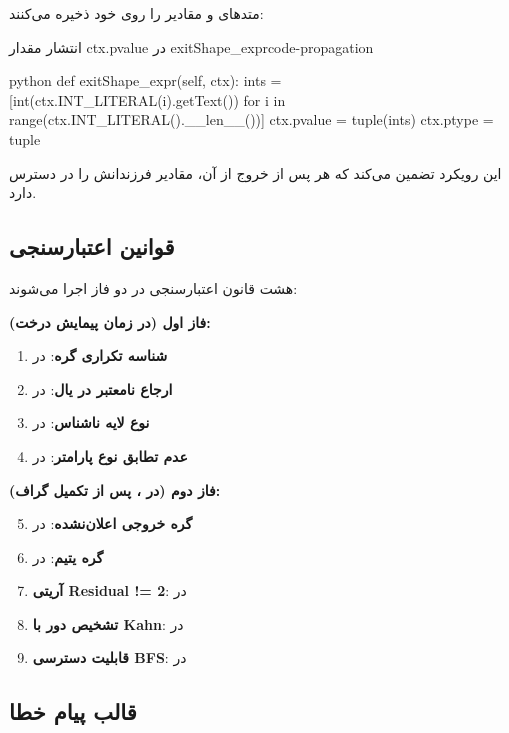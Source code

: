 \documentclass{nngraph-fa}
\begin{document}
متدهای  و  مقادیر را روی خود
 ذخیره می‌کنند:

\begin{codebox}{انتشار مقدار ctx.pvalue در exitShape\_expr}{code-propagation}
\begin{amzcode}{python}
def exitShape_expr(self, ctx):
    ints = [int(ctx.INT_LITERAL(i).getText())
            for i in range(ctx.INT_LITERAL().__len__())]
    ctx.pvalue = tuple(ints)
    ctx.ptype  = tuple
\end{amzcode}
\end{codebox}

این رویکرد تضمین می‌کند که هر  پس از خروج از آن، مقادیر
فرزندانش را در دسترس دارد.

\subsection{قوانین اعتبارسنجی}

هشت قانون اعتبارسنجی در دو فاز اجرا می‌شوند:

\textbf{فاز اول (در زمان پیمایش درخت):}
\begin{enumerate}
    \item \textbf{شناسه تکراری گره}: در 
    \item \textbf{ارجاع نامعتبر در یال}: در 
    \item \textbf{نوع لایه ناشناس}: در 
    \item \textbf{عدم تطابق نوع پارامتر}: در 
\end{enumerate}

\textbf{فاز دوم (در ، پس از تکمیل گراف):}
\begin{enumerate}
    \setcounter{enumi}{4}
    \item \textbf{گره خروجی اعلان‌نشده}: در 
    \item \textbf{گره یتیم}: در 
    \item \textbf{آریتی Residual != 2}: در 
    \item \textbf{تشخیص دور با Kahn}: در 
    \item \textbf{قابلیت دسترسی BFS}: در 
\end{enumerate}

\subsection{قالب پیام خطا}
\end{document}
